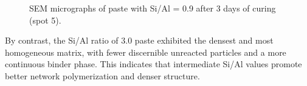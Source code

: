 \begin{figure}[H]
  \centering
  \caption{SEM micrographs of paste with Si/Al = 0.9 after 3 days of curing (spot 5).}
  \label{fig:si_al_0-9_spot5}
\end{figure}

By contrast, the Si/Al ratio of 3.0 paste exhibited the densest and most homogeneous matrix, with fewer discernible unreacted particles and a more continuous binder phase.
This indicates that intermediate Si/Al values promote better network polymerization and denser structure.

